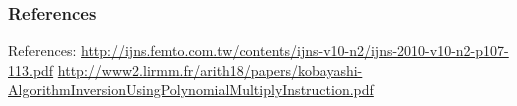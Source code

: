 \documentclass[12pt]{beamer}
\newcommand\Colorhref[3][cyan]{\href{#2}{\small\color{#1}#3}}
\begin{document}

\begin{frame}
\frametitle{References}
References: \newline
		[1] \Colorhref{http://ijns.femto.com.tw/contents/ijns-v10-n2/ijns-2010-v10-n2-p107-113.pdf}{http://ijns.femto.com.tw/contents/ijns-v10-n2/ijns-2010-v10-n2-p107-113.pdf} \newline
		[2] \Colorhref{http://www2.lirmm.fr/arith18/papers/kobayashi-AlgorithmInversionUsingPolynomialMultiplyInstruction.pdf}{http://www2.lirmm.fr/arith18/papers/kobayashi-AlgorithmInversionUsingPolynomialMultiplyInstruction.pdf}
\end{frame}
\end{document}
